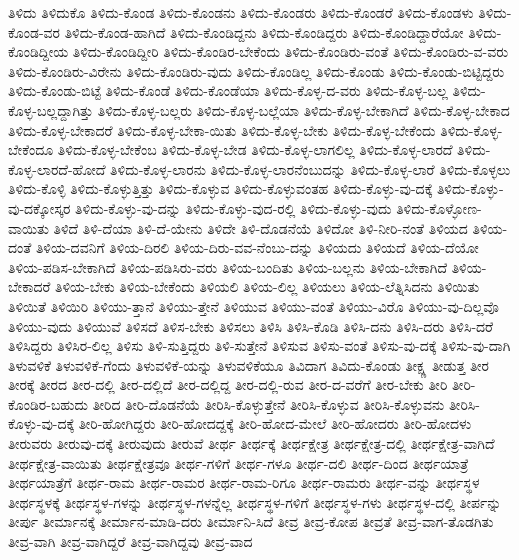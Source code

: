 {ತಿಳಿದು
ತಿಳಿದುಕೊ
ತಿಳಿದು-ಕೊಂಡ
ತಿಳಿದು-ಕೊಂಡನು
ತಿಳಿದು-ಕೊಂಡರು
ತಿಳಿದು-ಕೊಂಡರೆ
ತಿಳಿದು-ಕೊಂಡಳು
ತಿಳಿದು-ಕೊಂಡ-ವರ
ತಿಳಿದು-ಕೊಂಡ-ಹಾಗಿದೆ
ತಿಳಿದು-ಕೊಂಡಿದ್ದನು
ತಿಳಿದು-ಕೊಂಡಿದ್ದರು
ತಿಳಿದು-ಕೊಂಡಿದ್ದಾರೆಯೋ
ತಿಳಿದು-ಕೊಂಡಿದ್ದೀಯ
ತಿಳಿದು-ಕೊಂಡಿದ್ದೀರಿ
ತಿಳಿದು-ಕೊಂಡಿರ-ಬೇಕೆಂದು
ತಿಳಿದು-ಕೊಂಡಿರು-ವಂತೆ
ತಿಳಿದು-ಕೊಂಡಿರು-ವ-ವರು
ತಿಳಿದು-ಕೊಂಡಿರು-ವಿರೇನು
ತಿಳಿದು-ಕೊಂಡಿರು-ವುದು
ತಿಳಿದು-ಕೊಂಡಿಲ್ಲ
ತಿಳಿದು-ಕೊಂಡು
ತಿಳಿದು-ಕೊಂಡು-ಬಿಟ್ಟಿದ್ದರು
ತಿಳಿದು-ಕೊಂಡು-ಬಿಟ್ಟೆ
ತಿಳಿದು-ಕೊಂಡೆ
ತಿಳಿದು-ಕೊಂಡೆಯಾ
ತಿಳಿದು-ಕೊಳ್ಳ-ದ-ವರು
ತಿಳಿದು-ಕೊಳ್ಳ-ಬಲ್ಲ
ತಿಳಿದು-ಕೊಳ್ಳ-ಬಲ್ಲದ್ದಾಗಿತ್ತು
ತಿಳಿದು-ಕೊಳ್ಳ-ಬಲ್ಲರು
ತಿಳಿದು-ಕೊಳ್ಳ-ಬಲ್ಲೆಯಾ
ತಿಳಿದು-ಕೊಳ್ಳ-ಬೇಕಾಗಿದೆ
ತಿಳಿದು-ಕೊಳ್ಳ-ಬೇಕಾದ
ತಿಳಿದು-ಕೊಳ್ಳ-ಬೇಕಾದರೆ
ತಿಳಿದು-ಕೊಳ್ಳ-ಬೇಕಾ-ಯಿತು
ತಿಳಿದು-ಕೊಳ್ಳ-ಬೇಕು
ತಿಳಿದು-ಕೊಳ್ಳ-ಬೇಕೆಂದು
ತಿಳಿದು-ಕೊಳ್ಳ-ಬೇಕೆಂದೂ
ತಿಳಿದು-ಕೊಳ್ಳ-ಬೇಕೆಂಬ
ತಿಳಿದು-ಕೊಳ್ಳ-ಬೇಡ
ತಿಳಿದು-ಕೊಳ್ಳ-ಲಾಗಲಿಲ್ಲ
ತಿಳಿದು-ಕೊಳ್ಳ-ಲಾರದೆ
ತಿಳಿದು-ಕೊಳ್ಳ-ಲಾರದೆ-ಹೋದೆ
ತಿಳಿದು-ಕೊಳ್ಳ-ಲಾರನು
ತಿಳಿದು-ಕೊಳ್ಳ-ಲಾರನೆಂಬುದನ್ನು
ತಿಳಿದು-ಕೊಳ್ಳ-ಲಾರೆ
ತಿಳಿದು-ಕೊಳ್ಳಲು
ತಿಳಿದು-ಕೊಳ್ಳಿ
ತಿಳಿದು-ಕೊಳ್ಳುತ್ತಿತ್ತು
ತಿಳಿದು-ಕೊಳ್ಳುವ
ತಿಳಿದು-ಕೊಳ್ಳುವಂತಹ
ತಿಳಿದು-ಕೊಳ್ಳು-ವು-ದಕ್ಕೆ
ತಿಳಿದು-ಕೊಳ್ಳು-ವು-ದಕ್ಕೋಸ್ಕರ
ತಿಳಿದು-ಕೊಳ್ಳು-ವು-ದನ್ನು
ತಿಳಿದು-ಕೊಳ್ಳು-ವುದ-ರಲ್ಲಿ
ತಿಳಿದು-ಕೊಳ್ಳು-ವುದು
ತಿಳಿದು-ಕೊಳ್ಳೋಣ-ವಾಯಿತು
ತಿಳಿದೆ
ತಿಳಿ-ದೆಯಾ
ತಿಳಿ-ದೆ-ಯೇನು
ತಿಳಿದೇ
ತಿಳಿ-ದೊಡನೆಯೆ
ತಿಳಿದೋ
ತಿಳಿ-ನೀರಿ-ನಂತೆ
ತಿಳಿಯದ
ತಿಳಿಯ-ದಂತೆ
ತಿಳಿಯ-ದವನಿಗೆ
ತಿಳಿಯ-ದಿರಲಿ
ತಿಳಿಯ-ದಿರು-ವವ-ನೆಂಬು-ದನ್ನು
ತಿಳಿಯದು
ತಿಳಿಯದೆ
ತಿಳಿಯ-ದೆಯೋ
ತಿಳಿಯ-ಪಡಿಸ-ಬೇಕಾಗಿದೆ
ತಿಳಿಯ-ಪಡಿಸಿರು-ವರು
ತಿಳಿಯ-ಬಂದಿತು
ತಿಳಿಯ-ಬಲ್ಲನು
ತಿಳಿಯ-ಬೇಕಾಗಿದೆ
ತಿಳಿಯ-ಬೇಕಾದರೆ
ತಿಳಿಯ-ಬೇಕು
ತಿಳಿಯ-ಬೇಕೆಂದು
ತಿಳಿಯಲಿ
ತಿಳಿಯ-ಲಿಲ್ಲ
ತಿಳಿಯಲು
ತಿಳಿಯ-ಲೆತ್ನಿಸಿದನು
ತಿಳಿಯಿತು
ತಿಳಿಯಿತೆ
ತಿಳಿಯಿರಿ
ತಿಳಿಯು-ತ್ತಾನೆ
ತಿಳಿಯು-ತ್ತೇನೆ
ತಿಳಿಯುವ
ತಿಳಿಯು-ವಂತೆ
ತಿಳಿಯು-ವಿರೊ
ತಿಳಿಯು-ವು-ದಿಲ್ಲವೊ
ತಿಳಿಯು-ವುದು
ತಿಳಿಯುವೆ
ತಿಳಿಸದೆ
ತಿಳಿಸ-ಬೇಕು
ತಿಳಿಸಲು
ತಿಳಿಸಿ
ತಿಳಿಸಿ-ಕೊಡಿ
ತಿಳಿಸಿ-ದನು
ತಿಳಿಸಿ-ದರು
ತಿಳಿಸಿ-ದರೆ
ತಿಳಿಸಿದ್ದರು
ತಿಳಿಸಿರ-ಲಿಲ್ಲ
ತಿಳಿಸು
ತಿಳಿ-ಸುತ್ತಿದ್ದರು
ತಿಳಿ-ಸುತ್ತೇನೆ
ತಿಳಿಸುವ
ತಿಳಿಸು-ವಂತೆ
ತಿಳಿಸು-ವು-ದಕ್ಕೆ
ತಿಳಿಸು-ವು-ದಾಗಿ
ತಿಳುವಳಿಕೆ
ತಿಳುವಳಿಕೆ-ಗೆಂದು
ತಿಳುವಳಿಕೆ-ಯನ್ನು
ತಿಳುವಳಿಕೆಯೂ
ತಿವಿದಾಗ
ತಿವಿದು-ಕೊಂಡು
ತೀಕ್ಷ್ಣ
ತೀಡುತ್ತ
ತೀರ
ತೀರಕ್ಕೆ
ತೀರದ
ತೀರ-ದಲ್ಲಿ
ತೀರ-ದಲ್ಲಿದೆ
ತೀರ-ದಲ್ಲಿದ್ದ
ತೀರ-ದಲ್ಲಿ-ರುವ
ತೀರ-ದ-ವರೆಗೆ
ತೀರ-ಬೇಕು
ತೀರಿ
ತೀರಿ-ಕೊಂಡಿರ-ಬಹುದು
ತೀರಿದ
ತೀರಿ-ದೊಡನೆಯೆ
ತೀರಿಸಿ-ಕೊಳ್ಳುತ್ತೇನೆ
ತೀರಿಸಿ-ಕೊಳ್ಳುವ
ತೀರಿಸಿ-ಕೊಳ್ಳುವನು
ತೀರಿಸಿ-ಕೊಳ್ಳು-ವು-ದಕ್ಕೆ
ತೀರಿ-ಹೋಗಿದ್ದರು
ತೀರಿ-ಹೋದದ್ದಕ್ಕೆ
ತೀರಿ-ಹೋದ-ಮೇಲೆ
ತೀರಿ-ಹೋದರು
ತೀರಿ-ಹೋದಳು
ತೀರುವರು
ತೀರುವು-ದಕ್ಕೆ
ತೀರುವುದು
ತೀರುವೆ
ತೀರ್ಥ
ತೀರ್ಥಕ್ಕೆ
ತೀರ್ಥಕ್ಷೇತ್ರ
ತೀರ್ಥಕ್ಷೇತ್ರ-ದಲ್ಲಿ
ತೀರ್ಥಕ್ಷೇತ್ರ-ವಾಗಿದೆ
ತೀರ್ಥಕ್ಷೇತ್ರ-ವಾಯಿತು
ತೀರ್ಥಕ್ಷೇತ್ರವೂ
ತೀರ್ಥ-ಗಳಿಗೆ
ತೀರ್ಥ-ಗಳೂ
ತೀರ್ಥ-ದಲಿ
ತೀರ್ಥ-ದಿಂದ
ತೀರ್ಥಯಾತ್ರೆ
ತೀರ್ಥಯಾತ್ರೆಗೆ
ತೀರ್ಥ-ರಾಮ
ತೀರ್ಥ-ರಾಮರ
ತೀರ್ಥ-ರಾಮ-ರಿಗೂ
ತೀರ್ಥ-ರಾಮರು
ತೀರ್ಥ-ವನ್ನು
ತೀರ್ಥಸ್ಥಳ
ತೀರ್ಥಸ್ಥಳಕ್ಕೆ
ತೀರ್ಥಸ್ಥಳ-ಗಳನ್ನು
ತೀರ್ಥಸ್ಥಳ-ಗಳನ್ನೆಲ್ಲ
ತೀರ್ಥಸ್ಥಳ-ಗಳಿಗೆ
ತೀರ್ಥಸ್ಥಳ-ಗಳು
ತೀರ್ಥಸ್ಥಳ-ದಲ್ಲಿ
ತೀರ್ಪನ್ನು
ತೀರ್ಪು
ತೀರ್ಮಾನಕ್ಕೆ
ತೀರ್ಮಾನ-ಮಾಡಿ-ದರು
ತೀರ್ಮಾನಿ-ಸಿದೆ
ತೀವ್ರ
ತೀವ್ರ-ಕೋಪ
ತೀವ್ರತೆ
ತೀವ್ರ-ವಾಗ-ತೊಡಗಿತು
ತೀವ್ರ-ವಾಗಿ
ತೀವ್ರ-ವಾಗಿದ್ದರೆ
ತೀವ್ರ-ವಾಗಿದ್ದವು
ತೀವ್ರ-ವಾದ
}
